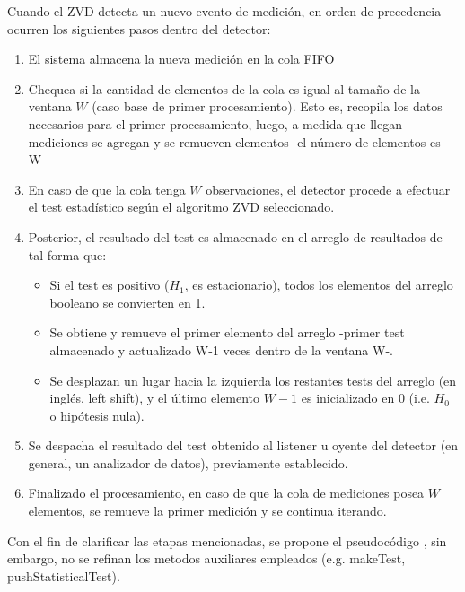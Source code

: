 \noindent Cuando el ZVD detecta un nuevo evento de medición, en orden de precedencia ocurren los siguientes pasos dentro del detector:
\begin{enumerate}
    \item El sistema almacena la nueva medición en la cola FIFO
    \item Chequea si la cantidad de elementos de la cola es igual al tamaño de la ventana $W$ (caso base de primer procesamiento). Esto es, recopila los datos necesarios para el primer procesamiento, luego, a medida que llegan mediciones se agregan y se remueven elementos -el número de elementos es W-
    \item En caso de que la cola tenga $W$ observaciones, el detector procede a efectuar el test estadístico según el algoritmo ZVD seleccionado.
    \item Posterior, el resultado del test es almacenado en el arreglo de resultados de tal forma que:
    \begin{itemize}
        \item Si el test es positivo ($H_1$, es estacionario), todos los elementos del arreglo booleano se convierten en 1.
        \item Se obtiene y remueve el primer elemento del arreglo -primer test almacenado y actualizado W-1 veces dentro de la ventana W-.
        \item Se desplazan un lugar hacia la izquierda los restantes tests del arreglo (en inglés, left shift), y el último elemento $W-1$ es inicializado en 0 (i.e. $H_0$ o hipótesis nula).
    \end{itemize}
    \item Se despacha el resultado del test obtenido al listener u oyente del detector (en general, un analizador de datos), previamente establecido.
    \item Finalizado el procesamiento, en caso de que la cola de mediciones posea $W$ elementos, se remueve la primer medición y se continua iterando.
\end{enumerate}

Con el fin de clarificar las etapas mencionadas, se propone el pseudocódigo , sin embargo, no se refinan los metodos auxiliares empleados (e.g. makeTest, pushStatisticalTest).

